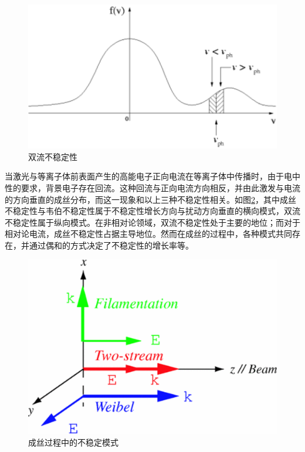 \begin{figure}[!htbp]
  \centering
  \includegraphics[width=\MyFactor\textwidth]{Img/twoStream.eps}
  \caption{双流不稳定性}
  \label{fig:twoStream}
\end{figure}


当激光与等离子体前表面产生的高能电子正向电流在等离子体中传播时，由于电中性的要求，背景电子存在回流。这种回流与正向电流方向相反，并由此激发与电流的方向垂直的成丝分布，而这一现象和以上三种不稳定性相关。如图\ref{fig:Bret2005}\cite{bret2005characterization}，其中成丝不稳定性与韦伯不稳定性属于不稳定性增长方向与扰动方向垂直的横向模式，双流不稳定性属于纵向模式。在非相对论领域，双流不稳定性处于主要的地位；而对于相对论电流，成丝不稳定性占据主导地位。然而在成丝的过程中，各种模式共同存在，并通过偶和的方式决定了不稳定性的增长率等。

\begin{figure}[!htbp]
  \centering
  \includegraphics[width=\MyFactor\textwidth]{Img/Bret2005.eps}
  \caption{成丝过程中的不稳定模式}
  \label{fig:Bret2005}
\end{figure}

